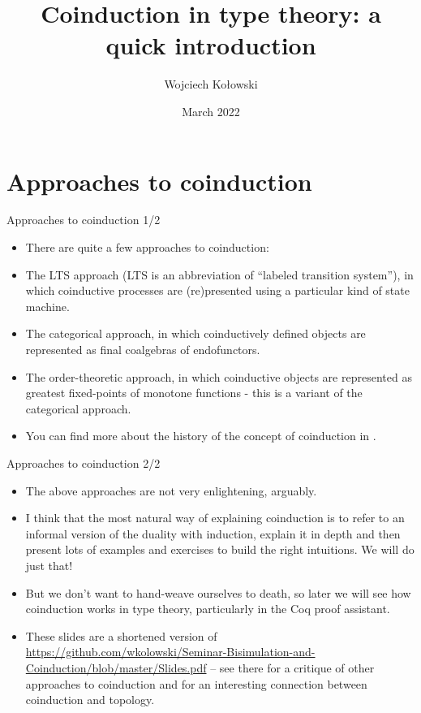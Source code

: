 \documentclass{beamer}
\title{Coinduction in type theory: a quick introduction}
\author{Wojciech Kołowski}
\date{March 2022}
\begin{document}
\frame{\titlepage}
\frame{\tableofcontents}

\section{Approaches to coinduction}

\begin{frame}{Approaches to coinduction 1/2}
\begin{itemize}
	\item There are quite a few approaches to coinduction:
	\item The LTS approach (LTS is an abbreviation of ``labeled transition system''), in which coinductive processes are (re)presented using a particular kind of state machine.
	\item The categorical approach, in which coinductively defined objects are represented as final coalgebras of endofunctors.
	\item The order-theoretic approach, in which coinductive objects are represented as greatest fixed-points of monotone functions - this is a variant of the categorical approach.
	\item You can find more about the history of the concept of coinduction in \href{https://dl.acm.org/doi/pdf/10.1145/1516507.1516510}{\color{blue}{On the Origins of Bisimulation and
  Coinduction}}.
\end{itemize}
\end{frame}

\begin{frame}{Approaches to coinduction 2/2}
\begin{itemize}
	\item The above approaches are not very enlightening, arguably.
	\item I think that the most natural way of explaining coinduction is to refer to an informal version of the duality with induction, explain it in depth and then present lots of examples and exercises to build the right intuitions. We will do just that!
  \item But we don't want to hand-weave ourselves to death, so later we will see how coinduction works in type theory, particularly in the Coq proof assistant.
  \item These slides are a shortened version of \url{https://github.com/wkolowski/Seminar-Bisimulation-and-Coinduction/blob/master/Slides.pdf} -- see there for a critique of other approaches to coinduction and for an interesting connection between coinduction and topology.
\end{itemize}
\end{frame}
\end{document}
